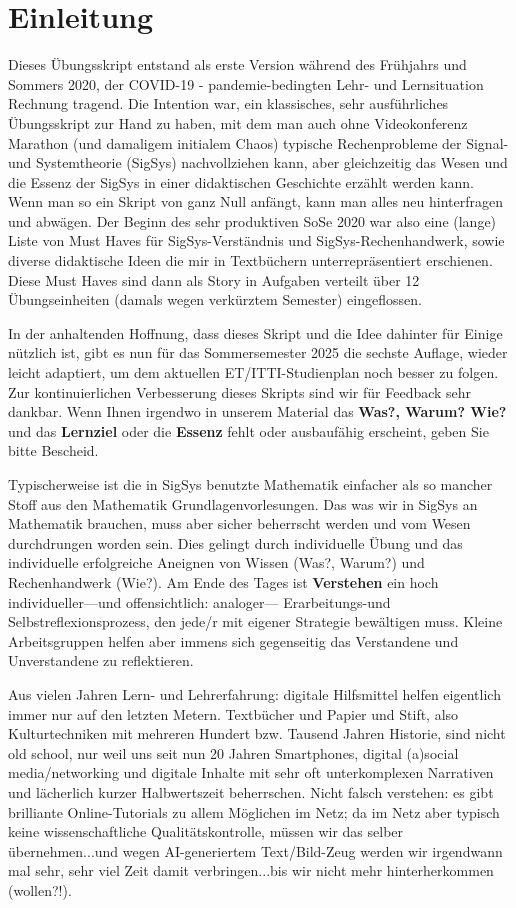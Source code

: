 \newpage
\section*{Einleitung}
%

Dieses Übungsskript entstand als erste Version während des Frühjahrs und Sommers 2020, der
COVID-19 - pandemie-bedingten Lehr- und Lernsituation Rechnung tragend.
%
Die Intention war, ein klassisches, sehr ausführliches Übungsskript zur Hand zu haben,
mit dem man auch ohne Videokonferenz Marathon (und damaligem initialem Chaos)
typische Rechenprobleme der Signal- und Systemtheorie (SigSys) nachvollziehen kann, aber gleichzeitig das Wesen und die Essenz der SigSys in einer didaktischen Geschichte erzählt werden kann.
%
Wenn man so ein Skript von ganz Null anfängt, kann man alles neu hinterfragen und abwägen. Der Beginn des sehr produktiven SoSe 2020 war also eine (lange) Liste von Must Haves für SigSys-Verständnis und SigSys-Rechenhandwerk, sowie diverse didaktische Ideen die mir in Textbüchern unterrepräsentiert erschienen. Diese Must Haves sind dann als Story in Aufgaben verteilt über 12 Übungseinheiten (damals wegen verkürztem Semester) eingeflossen.

In der anhaltenden Hoffnung, dass dieses Skript und die Idee dahinter für Einige nützlich ist, gibt es nun für das Sommersemester 2025 die sechste Auflage, wieder leicht adaptiert,
um dem aktuellen ET/ITTI-Studienplan noch besser zu folgen.
%
Zur kontinuierlichen Verbesserung dieses Skripts sind wir für Feedback sehr dankbar.
%
Wenn Ihnen irgendwo in unserem Material das \textbf{Was?, Warum? Wie?} und das
\textbf{Lernziel} oder die \textbf{Essenz} fehlt oder ausbaufähig erscheint, geben Sie bitte Bescheid.

Typischerweise ist die in SigSys benutzte Mathematik einfacher als so mancher
Stoff aus den Mathematik Grundlagenvorlesungen.
%
Das was wir in SigSys an Mathematik brauchen, muss aber sicher beherrscht werden
und vom Wesen durchdrungen worden sein.
%
Dies gelingt durch individuelle Übung und das individuelle erfolgreiche Aneignen
von Wissen (Was?, Warum?) und Rechenhandwerk (Wie?).
%
Am Ende des Tages ist \textbf{Verstehen} ein hoch individueller---und offensichtlich: analoger---
Erarbeitungs-und Selbstreflexionsprozess, den jede/r mit eigener Strategie bewältigen muss.
%
Kleine Arbeitsgruppen helfen aber immens sich gegenseitig das Verstandene und
Unverstandene zu reflektieren.

Aus vielen Jahren Lern- und Lehrerfahrung: digitale Hilfsmittel helfen eigentlich immer nur auf den letzten Metern. Textbücher und Papier und Stift, also Kulturtechniken mit mehreren Hundert bzw. Tausend Jahren Historie, sind nicht old school, nur weil uns seit nun 20 Jahren Smartphones, digital (a)social media/networking und digitale Inhalte mit sehr oft unterkomplexen Narrativen und lächerlich kurzer Halbwertszeit beherrschen. Nicht falsch verstehen: es gibt brilliante Online-Tutorials zu allem Möglichen im Netz; da im Netz aber typisch keine wissenschaftliche Qualitätskontrolle, müssen wir das selber übernehmen...und wegen AI-generiertem Text/Bild-Zeug werden wir irgendwann mal sehr, sehr viel Zeit damit verbringen...bis wir nicht mehr hinterherkommen (wollen?!).

